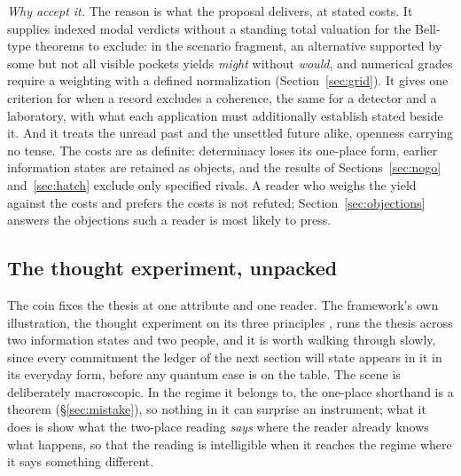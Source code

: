\textit{Why accept it.} The reason is what the proposal delivers, at stated costs. It supplies indexed modal verdicts without a standing total valuation for the Bell-type theorems to exclude: in the scenario fragment, an alternative supported by some but not all visible pockets yields \emph{might} without \emph{would}, and numerical grades require a weighting with a defined normalization (Section~\ref{sec:grid}). It gives one criterion for when a record excludes a coherence, the same for a detector and a laboratory, with what each application must additionally establish stated beside it. And it treats the unread past and the unsettled future alike, openness carrying no tense. The costs are as definite: determinacy loses its one-place form, earlier information states are retained as objects, and the results of Sections~\ref{sec:nogo} and~\ref{sec:hatch} exclude only specified rivals. A reader who weighs the yield against the costs and prefers the costs is not refuted; Section~\ref{sec:objections} answers the objections such a reader is most likely to press.

\subsection{The thought experiment, unpacked}\label{sec:hitchhiker}

The coin fixes the thesis at one attribute and one reader. The framework's own illustration, the thought experiment on its three principles \cite{Aethus}, runs the thesis across two information states and two people, and it is worth walking through slowly, since every commitment the ledger of the next section will state appears in it in its everyday form, before any quantum case is on the table. The scene is deliberately macroscopic. In the regime it belongs to, the one-place shorthand is a theorem (\S\ref{sec:mistake}), so nothing in it can surprise an instrument; what it does is show what the two-place reading \emph{says} where the reader already knows what happens, so that the reading is intelligible when it reaches the regime where it says something different.

